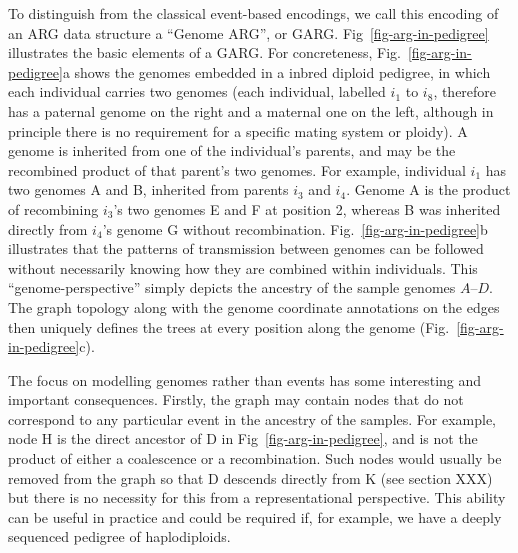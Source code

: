 \documentclass{article}
\begin{document}
To distinguish from the classical event-based encodings,
we call this encoding of an ARG data
structure a ``Genome ARG'', or GARG.
Fig~\ref{fig-arg-in-pedigree} illustrates the basic elements of a GARG.
For concreteness, Fig.~\ref{fig-arg-in-pedigree}a shows the genomes
embedded in a inbred diploid pedigree, in which each
individual carries two genomes (each individual, labelled $i_1$ to $i_8$,
therefore has a paternal genome on the right and a maternal one on
the left, although in principle there is no requirement for a specific mating
system or ploidy). A genome is inherited from one of the individual's parents,
and may be the recombined product of that parent's two genomes.
For example, individual $i_1$ has two genomes \textsf{A} and \textsf{B},
inherited from parents $i_3$ and $i_4$. Genome \textsf{A} is the product of
recombining $i_3$'s two genomes \textsf{E} and \textsf{F} at position 2,
whereas \textsf{B} was inherited directly from $i_4$'s genome \textsf{G} without
recombination. Fig.~\ref{fig-arg-in-pedigree}b illustrates that the patterns of
transmission between genomes can be followed without necessarily knowing
how they are combined within individuals. This ``genome-perspective''
simply depicts the ancestry of the sample genomes $A$--$D$. The graph
topology along with the genome coordinate annotations on the
edges then uniquely defines the trees at every position
along the genome (Fig.~\ref{fig-arg-in-pedigree}c).

The focus on modelling genomes rather than events has some interesting
and important consequences. Firstly, the graph may contain nodes that
do not correspond to any particular event in the ancestry of the samples.
For example, node \textsf{H} is the direct ancestor of \textsf{D} in
Fig~\ref{fig-arg-in-pedigree}, and is not the product of either a
coalescence or a recombination. Such nodes would usually be removed
from the graph so that \textsf{D} descends directly from \textsf{K} (see
section XXX) but there is no necessity for this from a representational
perspective. This ability can be useful in practice and could be required if,
for example, we have a deeply sequenced pedigree of
haplodiploids. %
\end{document}
